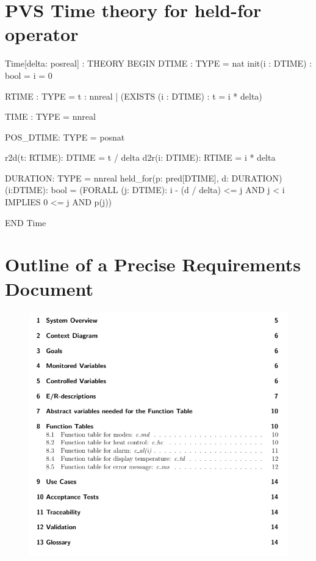 \documentclass[fontsize=12pt,paper=letter,twoside]{scrartcl}
\begin{document}
\tableofcontents
\listoffigures
\normalsize

\newpage





\appendix 

\section{PVS Time theory for held-for operator}\label{sec:time}

\begin{pvs}
Time[delta: posreal]  : THEORY
BEGIN
  DTIME : TYPE = nat
  init(i : DTIME) : bool = i = 0 

  RTIME : TYPE = {t : nnreal | (EXISTS (i : DTIME) : t = i * delta)}

  TIME : TYPE = nnreal

  POS_DTIME: TYPE = posnat
  
  r2d(t: RTIME): DTIME = t / delta
  d2r(i: DTIME): RTIME = i * delta

  DURATION: TYPE = nnreal
  held_for(p: pred[DTIME], d: DURATION)(i:DTIME): bool =
    (FORALL (j: DTIME): 
    i - (d / delta) <= j AND j < i IMPLIES 0 <= j AND p(j))

END Time
\end{pvs}

\section{Outline of a Precise Requirements Document}

\begin{figure}[htbp]
\begin{mdframed}
\begin{center}
\includegraphics[width=\textwidth]{pics/outline.png}
\end{center}
\end{mdframed}
\end{figure}
\end{document}
